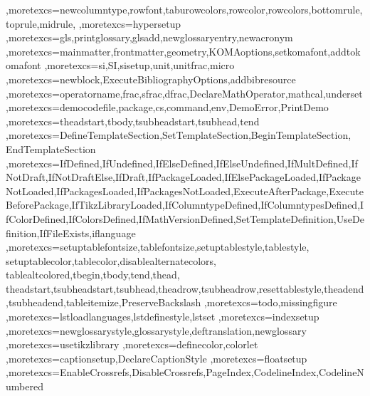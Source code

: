 {   %
   ,moretexcs={newcolumntype,rowfont,taburowcolors,rowcolor,rowcolors,bottomrule,
     toprule,midrule,}
   ,moretexcs={hypersetup}
   ,moretexcs={gls,printglossary,glsadd,newglossaryentry,newacronym}
   ,moretexcs={mainmatter,frontmatter,geometry,KOMAoptions,setkomafont,addtokomafont}
   ,moretexcs={si,SI,sisetup,unit,unitfrac,micro}
   ,moretexcs={newblock,ExecuteBibliographyOptions,addbibresource}
   ,moretexcs={operatorname,frac,sfrac,dfrac,DeclareMathOperator,mathcal,underset}
   ,moretexcs={democodefile,package,cs,command,env,DemoError,PrintDemo}  
   ,moretexcs={theadstart,tbody,tsubheadstart,tsubhead,tend}
   ,moretexcs={DefineTemplateSection,SetTemplateSection,BeginTemplateSection,
     EndTemplateSection}
   ,moretexcs={IfDefined,IfUndefined,IfElseDefined,IfElseUndefined,IfMultDefined,IfNotDraft,IfNotDraftElse,IfDraft,IfPackageLoaded,IfElsePackageLoaded,IfPackageNotLoaded,IfPackagesLoaded,IfPackagesNotLoaded,ExecuteAfterPackage,ExecuteBeforePackage,IfTikzLibraryLoaded,IfColumntypeDefined,IfColumntypesDefined,IfColorDefined,IfColorsDefined,IfMathVersionDefined,SetTemplateDefinition,UseDefinition,IfFileExists,iflanguage}
   ,moretexcs={setuptablefontsize,tablefontsize,setuptablestyle,tablestyle,  setuptablecolor,tablecolor,disablealternatecolors,   tablealtcolored,tbegin,tbody,tend,thead, theadstart,tsubheadstart,tsubhead,theadrow,tsubheadrow,resettablestyle,theadend,tsubheadend,tableitemize,PreserveBackslash}
   ,moretexcs={todo,missingfigure}
   ,moretexcs={lstloadlanguages,lstdefinestyle,lstset}
   ,moretexcs={indexsetup}
   ,moretexcs={newglossarystyle,glossarystyle,deftranslation,newglossary}
   ,moretexcs={usetikzlibrary}
   ,moretexcs={definecolor,colorlet}
   ,moretexcs={captionsetup,DeclareCaptionStyle}
   ,moretexcs={floatsetup}
   ,moretexcs={EnableCrossrefs,DisableCrossrefs,PageIndex,CodelineIndex,CodelineNumbered}
}


